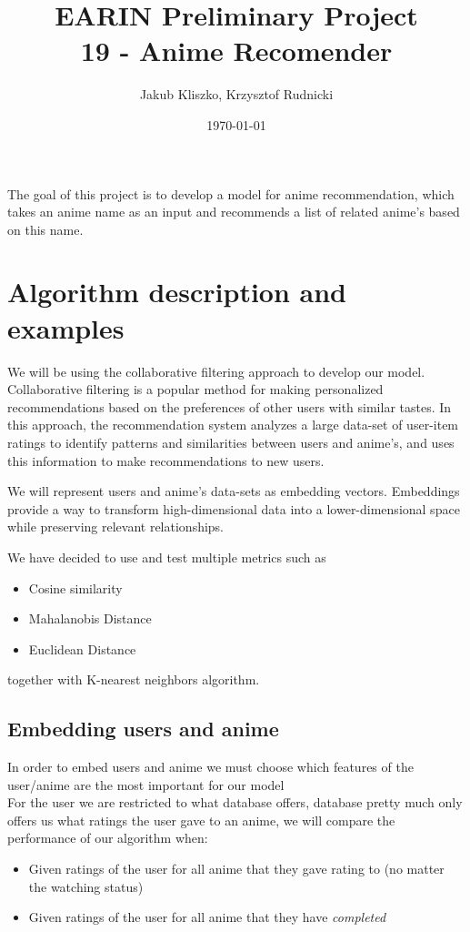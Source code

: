 \documentclass[12pt]{article}
\title{EARIN Preliminary Project \\ 
19 - Anime Recomender}
\author{Jakub Kliszko, Krzysztof Rudnicki }
\date{\today}
\begin{document}
\maketitle

The goal of this project is to develop a model for anime recommendation, which takes an anime name as an input and recommends a list of related anime's based on this name.  \\ 


\section{Algorithm description and examples}

We will be using the collaborative filtering approach to develop our model. \\ 
Collaborative filtering is a popular method for making personalized recommendations based on the preferences of other users with similar tastes. In this approach, the recommendation system analyzes a large data-set of user-item ratings to identify patterns and similarities between users and anime's, and uses this information to make recommendations to new users.

We will represent users and anime's data-sets as embedding vectors. Embeddings provide a way to transform high-dimensional data into a lower-dimensional space while preserving relevant relationships.

We have decided to use and test multiple metrics such as
\begin{itemize} 
    \item Cosine similarity
    \item Mahalanobis Distance
    \item Euclidean Distance
\end{itemize}
together with K-nearest neighbors algorithm. \\ 

\subsection{Embedding users and anime}
In order to embed users and anime we must choose which features of the user/anime are the most important for our model \\ 
For the user we are restricted to what database offers, database pretty much only offers us what ratings the user gave to an anime, we will compare the performance of our algorithm when:
\begin{itemize} 
\item Given ratings of the user for all anime that they gave rating to (no matter the watching status)
\item Given ratings of the user for all anime that they have \emph{completed}
\end{itemize}
\end{document}
